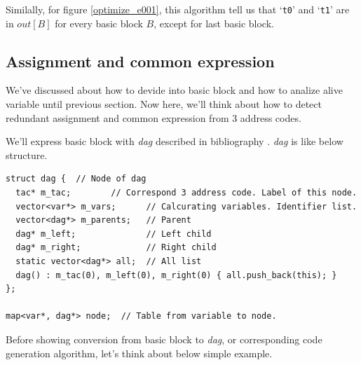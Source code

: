 \vspace{0.5cm}

Similally, for figure \ref{optimize_e001},
this algorithm tell us that
`{\tt{t0}}' and `{\tt{t1}}'
are in $out[B]$ for every basic block $B$, except for last basic block.

\subsection{Assignment and common expression}
\label{optimize_e_assign}
We've discussed about how to devide into basic block
and how to analize alive variable until previous section. Now here, 
we'll think about how to detect redundant assignment and common
expression from 3 address codes.

We'll express basic block with {\em dag} described in bibliography
 \cite{doragon}. {\em dag} is like below structure.

\begin{verbatim}
struct dag {  // Node of dag
  tac* m_tac;        // Correspond 3 address code. Label of this node.
  vector<var*> m_vars;      // Calcurating variables. Identifier list.
  vector<dag*> m_parents;   // Parent
  dag* m_left;              // Left child
  dag* m_right;             // Right child
  static vector<dag*> all;  // All list
  dag() : m_tac(0), m_left(0), m_right(0) { all.push_back(this); }
};

map<var*, dag*> node;  // Table from variable to node.
\end{verbatim}

Before showing conversion from basic block to {\em dag},
or corresponding code generation algorithm,
let's think about below simple example.

